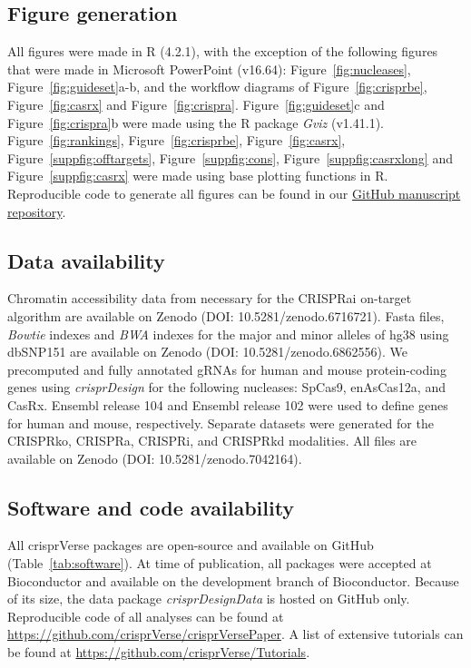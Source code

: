 \documentclass[pdftex,english,10pt]{article}
\begin{document}
{%

\subsection*{Figure generation}

All figures were made in R (4.2.1), with the exception of the following figures that were made in Microsoft PowerPoint (v16.64): Figure~\ref{fig:nucleases}, Figure~\ref{fig:guideset}a-b, and the workflow diagrams of Figure~\ref{fig:crisprbe}, Figure~\ref{fig:casrx} and Figure~\ref{fig:crispra}.  Figure~\ref{fig:guideset}c and Figure~\ref{fig:crispra}b were made using the R package \textit{Gviz} (v1.41.1). Figure~\ref{fig:rankings}, Figure~\ref{fig:crisprbe}, Figure~\ref{fig:casrx}, Figure~\ref{suppfig:offtargets}, Figure~\ref{suppfig:cons}, Figure~\ref{suppfig:casrxlong} and Figure~\ref{suppfig:casrx} were made using base plotting functions in R. Reproducible code to generate all figures can be found in our \href{https://github.com/crisprVerse/crisprVersePaper}{GitHub manuscript repository}. 





\subsection*{Data availability}

Chromatin accessibility data from \citet{crispria} necessary for the CRISPRai on-target algorithm are available on Zenodo (DOI: 10.5281/zenodo.6716721).
Fasta files, \textit{Bowtie} indexes and \textit{BWA} indexes for the major and minor alleles of hg38 using dbSNP151 are available on Zenodo (DOI: 10.5281/zenodo.6862556).
We precomputed and fully annotated gRNAs for human and mouse protein-coding genes using \textit{crisprDesign} for the following nucleases: SpCas9, enAsCas12a, and CasRx. Ensembl release 104 and Ensembl release 102 were used to define genes for human and mouse, respectively. Separate datasets were generated for the CRISPRko, CRISPRa, CRISPRi, and CRISPRkd modalities. All files are available on Zenodo (DOI: 10.5281/zenodo.7042164). 




\subsection*{Software and code availability}

All crisprVerse packages are open-source and available on GitHub (Table~\ref{tab:software}).
At time of publication, all packages were accepted at Bioconductor and available on the development branch of Bioconductor.
Because of its size, the data package \textit{crisprDesignData} is hosted on GitHub only. 
Reproducible code of all analyses can be found at \url{https://github.com/crisprVerse/crisprVersePaper}.
A list of extensive tutorials can be found at \url{https://github.com/crisprVerse/Tutorials}.

}
\end{document}
